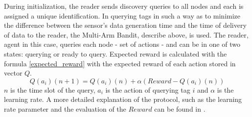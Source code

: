 During initialization, the reader sends discovery queries to all nodes and each is assigned a unique identification.
In querying tags in such a way as to minimize the difference between the sensor's data generation time and the time of delivery of data to the reader, the Multi-Arm Bandit, describe above, is used.
The reader, agent in this case, queries each node - set of actions - and can be in one of two states: querying or ready to query.
Expected reward is calculated with the formula \ref{expected_reward} with the expected reward of each action stored in vector $Q$.
\begin{equation}
    Q(a_i)(n+1) = Q(a_i)(n)+\alpha(Reward - Q(a_i)(n))
    \label{expected_reward}
\end{equation}
$n$ is the time slot of the query, $a_i$ is the action of querying tag $i$ and $\alpha$ is the learning rate.\newline
A more detailed explanation of the protocol, such as the learning rate parameter and the evaluation of the $Reward$ can be found in \cite{Maselli}.
